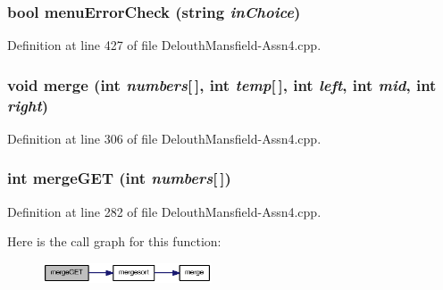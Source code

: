 \hypertarget{_delouth_mansfield-_assn4_8cpp_a3fcd92b059e256a9f46866c6d1e2b1e4}{
\subsubsection[{menuErrorCheck}]{\setlength{\rightskip}{0pt plus 5cm}bool menuErrorCheck (string {\em inChoice})}}
\label{_delouth_mansfield-_assn4_8cpp_a3fcd92b059e256a9f46866c6d1e2b1e4}


Definition at line 427 of file DelouthMansfield-\/Assn4.cpp.

\hypertarget{_delouth_mansfield-_assn4_8cpp_a22dd5c604dfcb67bc46bfd4bbb97d2f0}{
\subsubsection[{merge}]{\setlength{\rightskip}{0pt plus 5cm}void merge (int {\em numbers}\mbox{[}$\,$\mbox{]}, \/  int {\em temp}\mbox{[}$\,$\mbox{]}, \/  int {\em left}, \/  int {\em mid}, \/  int {\em right})}}
\label{_delouth_mansfield-_assn4_8cpp_a22dd5c604dfcb67bc46bfd4bbb97d2f0}


Definition at line 306 of file DelouthMansfield-\/Assn4.cpp.

\hypertarget{_delouth_mansfield-_assn4_8cpp_a5bf887ba10188a54f08008fba4edd364}{
\subsubsection[{mergeGET}]{\setlength{\rightskip}{0pt plus 5cm}int mergeGET (int {\em numbers}\mbox{[}$\,$\mbox{]})}}
\label{_delouth_mansfield-_assn4_8cpp_a5bf887ba10188a54f08008fba4edd364}


Definition at line 282 of file DelouthMansfield-\/Assn4.cpp.



Here is the call graph for this function:\nopagebreak
\begin{figure}[H]
\begin{center}
\leavevmode
\includegraphics[width=142pt]{_delouth_mansfield-_assn4_8cpp_a5bf887ba10188a54f08008fba4edd364_cgraph}
\end{center}
\end{figure}


